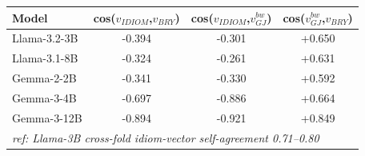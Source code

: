 \begin{tabular}{lccc}
\toprule
Model & cos($v_{IDIOM}$,$v_{BRY}$) & cos($v_{IDIOM}$,$v_{GJ}^{bw}$) & cos($v_{GJ}^{bw}$,$v_{BRY}$) \\
\midrule
Llama-3.2-3B & -0.394 & -0.301 & +0.650 \\
Llama-3.1-8B & -0.324 & -0.261 & +0.631 \\
Gemma-2-2B & -0.341 & -0.330 & +0.592 \\
Gemma-3-4B & -0.697 & -0.886 & +0.664 \\
Gemma-3-12B & -0.894 & -0.921 & +0.849 \\
\midrule
\multicolumn{4}{l}{\emph{ref: Llama-3B cross-fold idiom-vector self-agreement 0.71--0.80}} \\
\bottomrule
\end{tabular}
